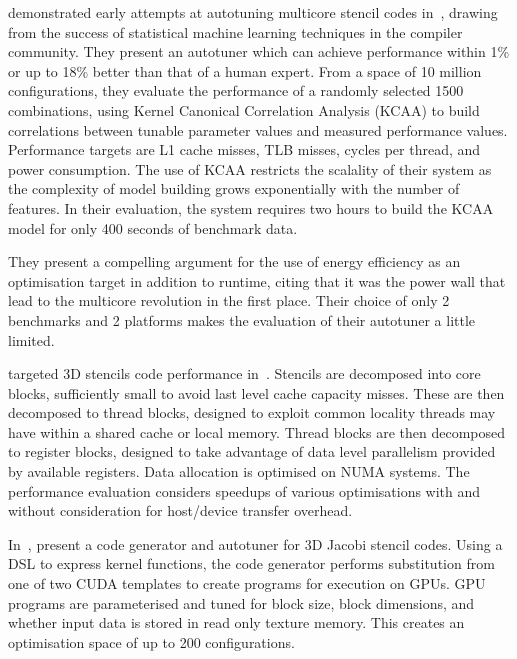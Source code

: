 \citeauthor{Ganapathi2009} demonstrated early attempts at autotuning
multicore stencil codes in~\cite{Ganapathi2009}, drawing from the
success of statistical machine learning techniques in the compiler
community. They present an autotuner which can achieve performance
within 1\% or up to 18\% better than that of a human expert. From a
space of 10 million configurations, they evaluate the performance of a
randomly selected 1500 combinations, using Kernel Canonical
Correlation Analysis (KCAA) to build correlations between tunable
parameter values and measured performance values. Performance targets
are L1 cache misses, TLB misses, cycles per thread, and power
consumption. The use of KCAA restricts the scalality of their system
as the complexity of model building grows exponentially with the
number of features. In their evaluation, the system requires two hours
to build the KCAA model for only 400 seconds of benchmark data.

They present a compelling argument for the use of energy efficiency as
an optimisation target in addition to runtime, citing that it was the
power wall that lead to the multicore revolution in the first
place. Their choice of only 2 benchmarks and 2 platforms makes the
evaluation of their autotuner a little limited.

\citeauthor{Berkeley2009} targeted 3D stencils code performance
in~\cite{Berkeley2009}. Stencils are decomposed into core blocks,
sufficiently small to avoid last level cache capacity misses. These
are then decomposed to thread blocks, designed to exploit common
locality threads may have within a shared cache or local
memory. Thread blocks are then decomposed to register blocks, designed
to take advantage of data level parallelism provided by available
registers. Data allocation is optimised on NUMA systems. The
performance evaluation considers speedups of various optimisations
with and without consideration for host/device transfer overhead.

In~\cite{Zhang2013a}, \citeauthor{Zhang2013a} present a code generator
and autotuner for 3D Jacobi stencil codes. Using a DSL to express
kernel functions, the code generator performs substitution from one of
two CUDA templates to create programs for execution on GPUs. GPU
programs are parameterised and tuned for block size, block dimensions,
and whether input data is stored in read only texture memory. This
creates an optimisation space of up to 200 configurations.

